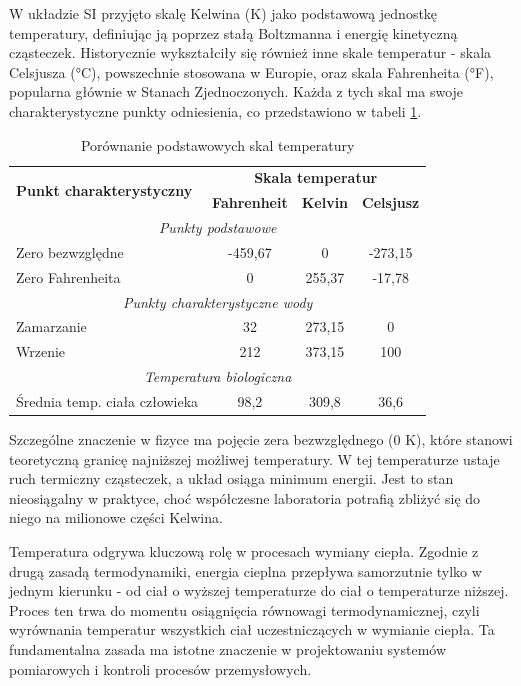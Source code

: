 \vspace{12pt}

W układzie SI przyjęto skalę Kelwina (K) jako podstawową jednostkę temperatury, definiując ją poprzez stałą Boltzmanna i energię kinetyczną cząsteczek. Historycznie wykształciły się również inne skale temperatur - skala Celsjusza (°C), powszechnie stosowana w Europie, oraz skala Fahrenheita (°F), popularna głównie w Stanach Zjednoczonych. Każda z tych skal ma swoje charakterystyczne punkty odniesienia, co przedstawiono w tabeli \ref{tab:skale_temperatur}.

\vspace{12pt}

\begin{table}[h]
\centering
\begin{tabular}{|l|c|c|c|}
\hline
\multirow{2}{*}{\textbf{Punkt charakterystyczny}} & \multicolumn{3}{c|}{\textbf{Skala temperatur}} \\
\cline{2-4}
& \textbf{Fahrenheit} & \textbf{Kelvin} & \textbf{Celsjusz} \\
\hline
\multicolumn{4}{|c|}{\textit{Punkty podstawowe}} \\
\hline
Zero bezwzględne & -459,67 & 0 & -273,15 \\
Zero Fahrenheita & 0 & 255,37 & -17,78 \\
\hline
\multicolumn{4}{|c|}{\textit{Punkty charakterystyczne wody}} \\
\hline
Zamarzanie & 32 & 273,15 & 0 \\
Wrzenie & 212 & 373,15 & 100 \\
\hline
\multicolumn{4}{|c|}{\textit{Temperatura biologiczna}} \\
\hline
Średnia temp. ciała człowieka & 98,2 & 309,8 & 36,6 \\
\hline
\end{tabular}
\caption{Porównanie podstawowych skal temperatury}
\label{tab:skale_temperatur}
\end{table}

Szczególne znaczenie w fizyce ma pojęcie zera bezwzględnego (0 K), które stanowi teoretyczną granicę najniższej możliwej temperatury. W tej temperaturze ustaje ruch termiczny cząsteczek, a układ osiąga minimum energii. Jest to stan nieosiągalny w praktyce, choć współczesne laboratoria potrafią zbliżyć się do niego na milionowe części Kelwina.

\vspace{16pt}

Temperatura odgrywa kluczową rolę w procesach wymiany ciepła. Zgodnie z drugą zasadą termodynamiki, energia cieplna przepływa samorzutnie tylko w jednym kierunku - od ciał o wyższej temperaturze do ciał o temperaturze niższej. Proces ten trwa do momentu osiągnięcia równowagi termodynamicznej, czyli wyrównania temperatur wszystkich ciał uczestniczących w wymianie ciepła. Ta fundamentalna zasada ma istotne znaczenie w projektowaniu systemów pomiarowych i kontroli procesów przemysłowych.

